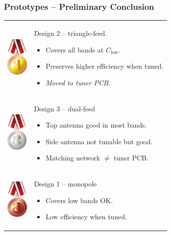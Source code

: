 \begin{frame}
    \frametitle{Prototypes -- Preliminary Conclusion}
    \begin{tabular}{m{0.4in}m{4in}}
        \rule{0pt}{0.9in}\includegraphics[height=0.75in]{img/soren/1st.pdf} & 
            Design 2 -- triangle-feed.
            \begin{itemize}
                \item Covers all bands at $C_{\text{low}}$.
                \item Preserves higher efficiency when tuned.
                \item \textit{Moved to tuner PCB}.
            \end{itemize}
            \\
        \rule{0pt}{0.9in}\includegraphics[height=0.75in]{img/soren/2nd.pdf} & 
            Design 3 -- dual-feed
            \begin{itemize}
                \item Top antenna good in most bands.
                \item Side antenna not tunable but good.
                \item Matching network $\neq$ tuner PCB.
            \end{itemize}
            \\
        \rule{0pt}{0.9in}\includegraphics[height=0.75in]{img/soren/3rd.pdf} & 
            Design 1 -- monopole
            \begin{itemize}
                \item Covers low bands OK.
                \item Low efficiency when tuned.
            \end{itemize}
    \end{tabular}
\end{frame}
